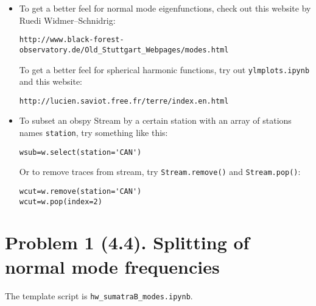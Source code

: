 \documentclass[11pt,titlepage,fleqn]{article}
\newcommand{\tfilemodes}{{\tt hw\_sumatraB\_modes.ipynb}}
\begin{document}
\begin{spacing}{1.0}
\begin{itemize}
\begin{itemize}

\end{itemize}


\item To get a better feel for normal mode eigenfunctions, check out this website by Ruedi Widmer--Schnidrig:
%
\begin{verbatim}
http://www.black-forest-observatory.de/Old_Stuttgart_Webpages/modes.html
\end{verbatim}
%
To get a better feel for spherical harmonic functions, try out \verb+ylmplots.ipynb+ and this website:
%
\begin{verbatim}
http://lucien.saviot.free.fr/terre/index.en.html
\end{verbatim}


\item To subset an obspy Stream by a certain station with an array of stations names \verb+station+, try something like this:
%
\begin{verbatim}
wsub=w.select(station='CAN')
\end{verbatim}

Or to remove traces from stream, try \verb+Stream.remove()+ and \verb+Stream.pop()+:

\begin{verbatim}
wcut=w.remove(station='CAN')
wcut=w.pop(index=2)     
\end{verbatim}
%

\end{itemize}

\end{spacing}


\section*{Problem 1 (4.4). Splitting of normal mode frequencies}

The template script is \tfilemodes.
\end{document}
